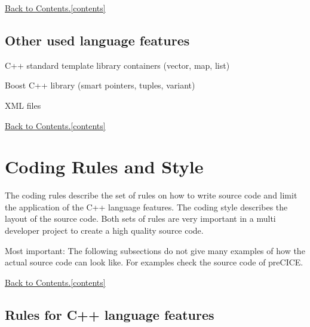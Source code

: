 \documentclass[11pt, oneside]{scrartcl}
\newcommand{\backtocontents}{\hyperref[contents]{Back to Contents.\ref*{contents}}}
\begin{document}
\backtocontents

\subsection{Other used language features}

\begin{itemize*}
\item C++ standard template library containers (vector, map, list)
\item Boost C++ library (smart pointers, tuples, variant)
\item XML files
\end{itemize*}

\backtocontents
      
\section{Coding Rules and Style} \label{chap:styleguide}

The coding rules describe the set of rules on how to write source code and limit the
application of the C++ language features. The coding style describes the layout of
the source code. Both sets of rules are very important in a multi developer project
to create a high quality source code.

Most important: The following subsections do not give many examples of how the 
actual source code can look like. For examples check the source code of 
preCICE.

\backtocontents

\subsection{Rules for C++ language features}
\end{document}
